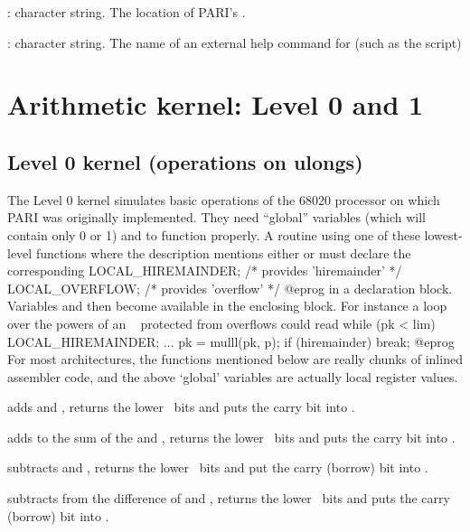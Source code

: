 
: character string. The location of PARI's .

: character string. The name of an external help command
for  (such as the  script)

\newpage
\chapter{Arithmetic kernel: Level 0 and 1}

\section{Level 0 kernel (operations on ulongs)}

The Level 0 kernel simulates basic operations of the 68020 processor on which
PARI was originally implemented. They need ``global''  variables
 (which will contain only 0 or 1) and  to
function properly. A routine using one of these lowest-level functions
where the description mentions either  or 
must declare the corresponding
\bprog
  LOCAL_HIREMAINDER;  /* provides 'hiremainder' */
  LOCAL_OVERFLOW;     /* provides 'overflow' */
@eprog\noindent
in a declaration block. Variables  and  then
become available in the enclosing block. For instance a loop over the powers
of an ~ protected from overflows could read
\bprog
 while (pk < lim)
 {
   LOCAL_HIREMAINDER;
   ...
   pk = mulll(pk, p); if (hiremainder) break;
 }
@eprog\noindent
For most architectures, the functions mentioned below are really chunks of
inlined assembler code, and the above `global' variables are actually
local register values.

 adds  and , returns the
lower \B\ bits and puts the carry bit into .

 adds  to the sum of the
 and , returns the lower \B\ bits and puts the carry bit into
.

 subtracts  and , returns
the lower \B\ bits and put the carry (borrow) bit into .

 subtracts  from the
difference of  and , returns the lower \B\ bits and puts the
carry (borrow) bit into .

